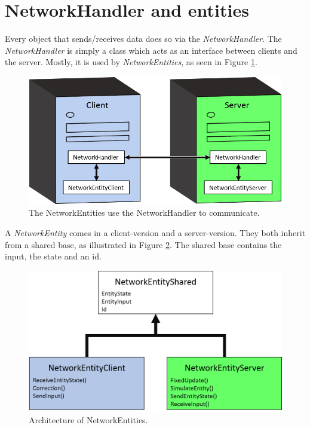 \section{NetworkHandler and entities}
Every object that sends/receives data does so via the \emph{NetworkHandler}.
The \emph{NetworkHandler} is simply a class which acts as an interface between clients and the server.
Mostly, it is used by \emph{NetworkEntities}, as seen in Figure \ref{fig:networkHandler}.

\begin{figure}[H]
\centering
\includegraphics[scale=1]{figures/network/networkHandler}
\caption{The NetworkEntities use the NetworkHandler to communicate.}
\label{fig:networkHandler}
\end{figure}

A \emph{NetworkEntity} comes in a client-version and a server-version.
They both inherit from a shared base, as illustrated in Figure \ref{fig:networkEntity}.
The shared base contains the input, the state and an id.

\begin{figure}[H]
\centering
\includegraphics[scale=0.6]{figures/network/networkEntity}
\caption{Architecture of NetworkEntities.}
\label{fig:networkEntity}
\end{figure}

